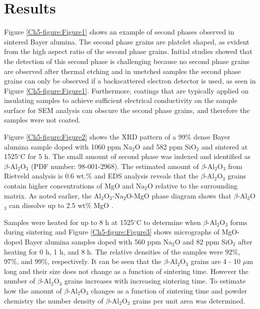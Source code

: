 \section{Results}
Figure \ref{Ch5-figure:Figure1} shows an example of second phases observed in sintered Bayer alumina. The second phase grains are platelet shaped, as evident from the high aspect ratio of the second phase grains. Initial studies showed that the detection of this second phase is challenging because no second phase grains are observed after thermal etching and in unetched samples the second phase grains can only be observed if a backscattered electron detector is used, as seen in Figure \ref{Ch5-figure:Figure1}. Furthermore, coatings that are typically applied on insulating samples to achieve sufficient electrical conductivity on the sample surface for SEM analysis can obscure the second phase grains, and therefore the samples were not coated.

Figure \ref{Ch5-figure:Figure2} shows the XRD pattern of a 99\% dense Bayer alumina sample doped with 1060 ppm Na$_{2}$O and 582 ppm SiO$_{2}$ and sintered at 1525$^{\circ}$C for 5 h. The small amount of second phase was indexed and identified as $\beta$-Al$_{2}$O$_{3}$ (PDF number: 98-001-2968). The estimated amount of $\beta$-Al$_{2}$O$_{3}$ from Rietveld analysis is 0.6 wt.\% and EDS analysis reveals that the $\beta$-Al$_{2}$O$_{3}$ grains contain higher concentrations of MgO and Na$_{2}$O relative to the surrounding matrix. As noted earlier, the Al$_{2}$O$_{3}$-Na$_{2}$O-MgO phase diagram shows that $\beta$-Al$_{2}$O$_{3}$ can dissolve up to 2.5 wt\% MgO \cite{Kummer1972a}.

Samples were heated for up to 8 h at 1525$^{\circ}$C to determine when $\beta$-Al$_{2}$O$_{3}$ forms during sintering and Figure \ref{Ch5-figure:Figure3} shows micrographs of MgO-doped Bayer alumina samples doped with 560 ppm Na$_{2}$O and 82 ppm SiO$_{2}$ after heating for 0 h, 1 h, and 8 h. The relative densities of the samples were 92\%, 97\%, and 99\%, respectively. It can be seen that the $\beta$-Al$_{2}$O$_{3}$ grains are 4 - 10 $\mu$m long and their size does not change as a function of sintering time. However the number of $\beta$-Al$_{2}$O$_{3}$ grains increases with increasing sintering time. To estimate how the amount of $\beta$-Al$_{2}$O$_{3}$ changes as a function of sintering time and powder chemistry the number density of $\beta$-Al$_{2}$O$_{3}$ grains per unit area was determined. 

